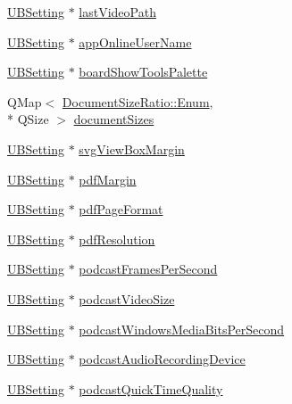 \begin{DoxyCompactItemize}
\item 
\hyperlink{class_u_b_setting}{U\-B\-Setting} $\ast$ \hyperlink{class_u_b_settings_a650971fad41bf8076bd00d678c30c616}{last\-Video\-Path}
\item 
\hyperlink{class_u_b_setting}{U\-B\-Setting} $\ast$ \hyperlink{class_u_b_settings_ae6a9a56f54ae912cf860fb8a88d54255}{app\-Online\-User\-Name}
\item 
\hyperlink{class_u_b_setting}{U\-B\-Setting} $\ast$ \hyperlink{class_u_b_settings_ae51b478ae881449a3a9079ca34a41379}{board\-Show\-Tools\-Palette}
\item 
Q\-Map$<$ \hyperlink{struct_document_size_ratio_a5a7547375e6ea65421c7cbe46b2aed8a}{Document\-Size\-Ratio\-::\-Enum}, \\*
Q\-Size $>$ \hyperlink{class_u_b_settings_a2c7e1b2471296349a87237358c932077}{document\-Sizes}
\item 
\hyperlink{class_u_b_setting}{U\-B\-Setting} $\ast$ \hyperlink{class_u_b_settings_ac33abd6b8efc6d97f4d04e16e22bd215}{svg\-View\-Box\-Margin}
\item 
\hyperlink{class_u_b_setting}{U\-B\-Setting} $\ast$ \hyperlink{class_u_b_settings_a9b23093384b7e7fc7e51f28aff9191a3}{pdf\-Margin}
\item 
\hyperlink{class_u_b_setting}{U\-B\-Setting} $\ast$ \hyperlink{class_u_b_settings_a18512a64aed802118cb7f2f44c4ea8f4}{pdf\-Page\-Format}
\item 
\hyperlink{class_u_b_setting}{U\-B\-Setting} $\ast$ \hyperlink{class_u_b_settings_af913238e2c69d4b6bf1bddc9b8d0dd4e}{pdf\-Resolution}
\item 
\hyperlink{class_u_b_setting}{U\-B\-Setting} $\ast$ \hyperlink{class_u_b_settings_ade358dfc3050406270ae6754bafc04b7}{podcast\-Frames\-Per\-Second}
\item 
\hyperlink{class_u_b_setting}{U\-B\-Setting} $\ast$ \hyperlink{class_u_b_settings_ab8756a27d8b5a900364370d7c97b6a9e}{podcast\-Video\-Size}
\item 
\hyperlink{class_u_b_setting}{U\-B\-Setting} $\ast$ \hyperlink{class_u_b_settings_ad1dc0e79b487d48b5814d29fc394ad37}{podcast\-Windows\-Media\-Bits\-Per\-Second}
\item 
\hyperlink{class_u_b_setting}{U\-B\-Setting} $\ast$ \hyperlink{class_u_b_settings_ab100dfc618a4defb43cbd56076fedb13}{podcast\-Audio\-Recording\-Device}
\item 
\hyperlink{class_u_b_setting}{U\-B\-Setting} $\ast$ \hyperlink{class_u_b_settings_aa5f3b00cd5e8136cae4cd294c46f5634}{podcast\-Quick\-Time\-Quality}
\item 

\end{DoxyCompactItemize}
